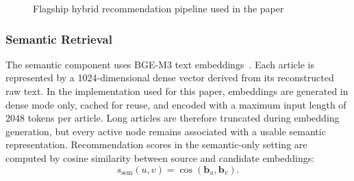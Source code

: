 \documentclass[runningheads]{llncs}
\begin{document}

\begin{figure}[!htbp]
\centering
\setlength{\fboxsep}{6pt}
\caption{Flagship hybrid recommendation pipeline used in the paper}
\label{fig:paper-pipeline}
\end{figure}

\subsubsection{Semantic Retrieval}

The semantic component uses BGE-M3 text embeddings~\cite{chen2024m3embedding}.
Each article is represented by a 1024-dimensional dense vector derived from its
reconstructed raw text. In the implementation used for this paper, embeddings
are generated in dense mode only, cached for reuse, and encoded with a maximum
input length of 2048 tokens per article. Long articles are therefore truncated
during embedding generation, but every active node remains associated with a
usable semantic representation. Recommendation scores in the semantic-only
setting are computed by cosine similarity between source and candidate
embeddings:
\begin{equation}
s_{\mathrm{sem}}(u,v)=\cos(\mathbf{b}_u,\mathbf{b}_v).
\end{equation}
\end{document}

